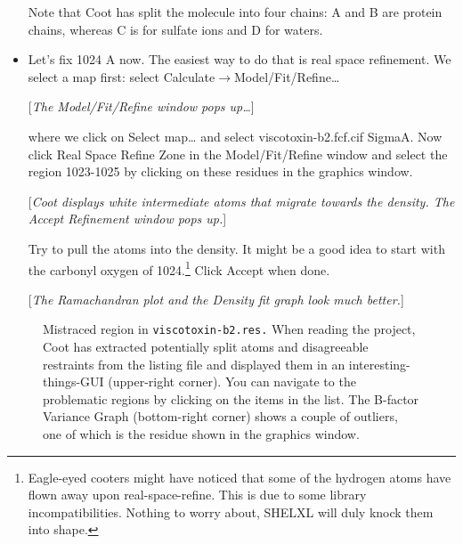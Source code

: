 \documentclass{article}
\begin{document}
\begin{itemize}
Note that Coot has split the molecule into four chains: A and B are protein chains, whereas C is for sulfate ions and D for waters.


\item Let's fix 1024 A now. The easiest way to do that is real space refinement. We select a map first: select \textsf{Calculate$\to$Model/Fit/Refine\ldots}

[\textsl{The \textsf{Model/Fit/Refine} window pops up\ldots}]

where we click on \textsf{Select map\ldots} and select viscotoxin-b2.fcf.cif SigmaA. Now click \textsf{Real Space Refine Zone} in the \textsf{Model/Fit/Refine} window and select the region 1023-1025 by clicking on these residues in the graphics window.

[\textsl{Coot displays white intermediate atoms that migrate towards the density. The \textsf{Accept Refinement} window pops up.}]

Try to pull the atoms into the density. It might be a good idea to start with the carbonyl oxygen of 1024.\footnote{Eagle-eyed cooters might have noticed that some of the hydrogen atoms have flown away upon real-space-refine. This is due to some library incompatibilities. Nothing to worry about, SHELXL will duly knock them into shape.} Click \textsf{Accept} when done.

[\textsl{The Ramachandran plot and the Density fit graph look much better.}]
\end{itemize}

\begin{figure}[htbp]
    \begin{center}
    \epsfxsize 5in
    \parbox{5in}{\caption{\label{fig:viscotoxin} Mistraced region in \texttt{viscotoxin-b2.res.} When reading the project, Coot has extracted potentially split atoms and disagreeable restraints from the listing file and displayed them in an interesting-things-GUI (upper-right corner). You can navigate to the problematic regions by clicking on the items in the list. The B-factor Variance Graph (bottom-right corner) shows a couple of outliers, one of which is the residue shown in the graphics window.}}
    \end{center}
\end{figure}
\end{document}
